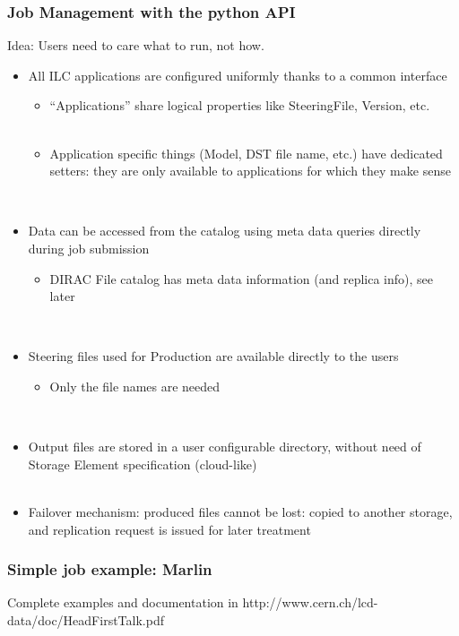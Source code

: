 \documentclass[10pt,table,dvipsnames]{beamer}
\begin{document}
\begin{frame}
  \frametitle{Job Management with the python API}
Idea: \alert{Users need to care what to run, not how.}
\begin{itemize}
\item All ILC {\color{NavyBlue}applications are configured uniformly} thanks to a common interface
  \begin{itemize}
  \item {\color{ForestGreen} ``Applications'' share logical properties} like SteeringFile,
    Version, etc.\\
~\\
  \item {\color{ForestGreen}Application specific things} (Model, DST file name, etc.) have
    {\color{ForestGreen} dedicated setters}: they are only available to applications for
    which they make sense
  \end{itemize}
~\\
\item {\color{NavyBlue}Data can be accessed} from the catalog using {\color{NavyBlue}meta data queries}
  directly during job submission
  \begin{itemize}
  \item DIRAC File catalog has meta data information (and replica
    info), see later\\
  \end{itemize}
~\\
\item {\color{NavyBlue}Steering files} used for Production are {\color{NavyBlue}available directly} to the
  users
  \begin{itemize}
  \item Only the file names are needed
  \end{itemize}
~\\
\item {\color{NavyBlue}Output files} are stored in a user configurable directory,
  without need of Storage Element specification
  ({\color{NavyBlue}cloud-like})\\
~\\
\item Failover mechanism: \alert{produced files cannot be lost}:
  copied to another storage, and replication request is issued for
  later treatment
\end{itemize}
\end{frame}

\begin{frame}
  \frametitle{Simple job example: Marlin} 
 
Complete examples and documentation in {\color{blue}http://www.cern.ch/lcd-data/doc/HeadFirstTalk.pdf}
\end{frame}
\end{document}
